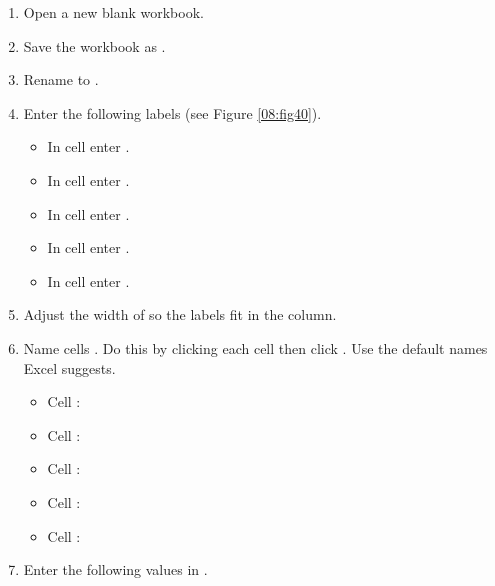 \begin{enumerate}
	\item Open a new blank workbook.
	\item Save the workbook as .
	\item Rename  to .
	\item Enter the following labels (see Figure \ref{08:fig40}).
	
	\begin{itemize}
		\item In cell  enter .
		\item In cell  enter .
		\item In cell  enter .
		\item In cell  enter .
		\item In cell  enter .
	\end{itemize}
	
	\item Adjust the width of  so the labels fit in the column.
	\item Name cells . Do this by clicking each cell then click . Use the default names Excel suggests.

	\begin{itemize}
		\item Cell : 
		\item Cell : 
		\item Cell : 
		\item Cell : 
		\item Cell : 
	\end{itemize}

	\item Enter the following values in .


\end{enumerate}
